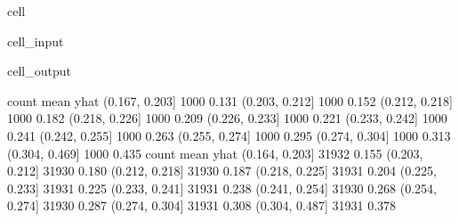 \documentclass[letterpaper,10pt,english]{jupyterBook}
\begin{document}
\begin{sphinxuseclass}{cell}\begin{sphinxVerbatimInput}

\begin{sphinxuseclass}{cell_input}
\begin{sphinxVerbatim}[commandchars=\\\{\}]
 
 
\end{sphinxVerbatim}

\end{sphinxuseclass}\end{sphinxVerbatimInput}
\begin{sphinxVerbatimOutput}

\begin{sphinxuseclass}{cell_output}
\begin{sphinxVerbatim}[commandchars=\\\{\}]
                count  mean
yhat                       
(0.167, 0.203]   1000 0.131
(0.203, 0.212]   1000 0.152
(0.212, 0.218]   1000 0.182
(0.218, 0.226]   1000 0.209
(0.226, 0.233]   1000 0.221
(0.233, 0.242]   1000 0.241
(0.242, 0.255]   1000 0.263
(0.255, 0.274]   1000 0.295
(0.274, 0.304]   1000 0.313
(0.304, 0.469]   1000 0.435
                count  mean
yhat                       
(0.164, 0.203]  31932 0.155
(0.203, 0.212]  31930 0.180
(0.212, 0.218]  31930 0.187
(0.218, 0.225]  31931 0.204
(0.225, 0.233]  31931 0.225
(0.233, 0.241]  31931 0.238
(0.241, 0.254]  31930 0.268
(0.254, 0.274]  31930 0.287
(0.274, 0.304]  31931 0.308
(0.304, 0.487]  31931 0.378
\end{sphinxVerbatim}

\noindent{}

\end{sphinxuseclass}\end{sphinxVerbatimOutput}

\end{sphinxuseclass}






\renewcommand{\indexname}{Index}
\printindex
\end{document}
